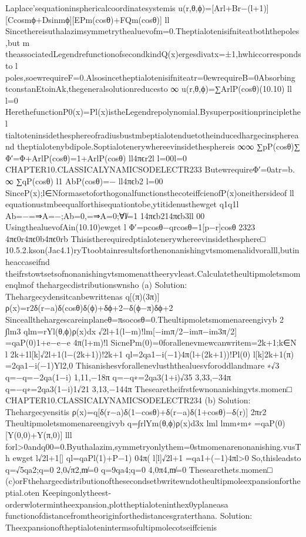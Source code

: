{{{{{{{{{{{{{{{Laplace’sequationinsphericalcoordinatesystemis
u(r,θ,ϕ)=[Arl+Br−(l+1)][Ccosmϕ+Dsinmϕ][EPm(cosθ)+FQm(cosθ)]
ll
Sincethereisuthalazimsymmetrythealuevofm=0.Theptialotenisifniteatboththepoles,but
m
theassociatedLegendrefunctionofsecondkindQ(x)ergesdivatx=±1,hwhiccorrespondsto
l
poles,soewrequireF=0.Alsosincetheptialotenisifniteatr=0ewrequireB=0Absorbing
tconstanEtoinAk,thegeneralsolutionreducesto
∞
u(r,θ,ϕ)=∑ArlP(cosθ)(10.10)
ll
l=0
HerethefunctionP0(x)=Pl(x)istheLegendrepolynomial.Bysuperpositionprinciplethe
l
tialtoteninsidethesphereofradiusbustmbeptialotenduetotheinducedhargecinsphereand
theptialotenybdipole.Soptialotenerywhereevinsidethesphereis
∞∞
∑pP(cosθ)∑
Φ′=Φ+ArlP(cosθ)=1+ArlP(cosθ)
ll4πϵr2l
l=00l=0
CHAPTER10.CLASSICALYNAMICSODELECTR233
ButewrequireΦ′=0atr=b.
∞
∑qP(cosθ)
l1
AbP(cosθ)=−
ll4πϵb2
l=00
Since{P(x);l∈N}formasetoforthogonalfunctionsthecoteiffcienofP(x)oneithersideof
ll
equationustmbeequalforthisequationtobe,ytitidenusthewget
q1q1l
Ab=−=⇒A=−;Ab=0,=⇒A=0;∀l̸=1
14πϵb214πϵb3ll
00
UsingthealuevofAin(10.10)ewget
l
Φ′=pcosθ−qrcosθ=1[p−r]cosθ
2323
4πϵ0r4πϵ0b4πϵ0rb
Thisistherequiredptialotenerywhereevinsidethesphere□
10.5.2.kson(Jac4.1)ryTtoobtainresultsforthenonanishingvtsmomenalidvoralll,butinheaccaseifnd
theifrstowtsetsofnonanishingvtsmomenattheeryvleast.Calculatetheultipmoletsmomenqlmof
thehargecdistributionswnsho
(a)
Solution:
Thehargecydensitcanbewrittenas
q[(π)(3π)]
ρ(x)=r2δ(r−a)δ(cosθ)δ(ϕ)+δϕ+2−δ(ϕ−π)δϕ+2
Sinceallthehargescareinplaneθ=πsocosθ=0.Theultipmoletsmomenareengivyb
2
∫lm3
qlm=rYl(θ,ϕ)ρ(x)dx
√2l+1(l−m)!lm[−imπ/2−imπ−im3π/2]
=qaP(0)1+e−e−e
4π(l+m)!l
SicnePm(0)=0forallenevmewcanwritem=2k+1;k∈N
l
2k+1l[k]√2l+1(l−(2k+1))!2k+1
ql=2qa1−i(−1)4π(l+(2k+1))!Pl(0)
l[k]2k+1(π)
=2qa1−i(−1)Yl2,0
Thisanishesvforallenevlusththealuesvforoddlandmare
∗√3
q=−q=−2qa(1−i)
1,11,−18π
q=−q∗=2qa3(1+i)√35
3,33,−34π
q=−q∗=2qa3(1−i)1√21
3,13,−144π
Thesearetheifrstfewnonanishingvts.momen□
CHAPTER10.CLASSICALYNAMICSODELECTR234
(b)
Solution:
Thehargecyensitis
ρ(x)=q[δ(r−a)δ(1−cosθ)+δ(r−a)δ(1+cosθ)−δ(r)]
2πr2
Theultipmoletsmomenareengivyb
q=∫rlYm(θ,ϕ)ρ(x)d3x
lml
lmm∗m∗
=qaP(0)[Y(0,0)+Y(π,0)]
lll
forl>0andq00=0.Byuthalazim,symmetryonlythem=0stmomenarenonanishing.vusTh
ewget
l√2l+1[]
ql=qaPl(1)+P−1)
04π(
l[l]√2l+1
=qa1+(−1)4πl>0
So,thisleadsto
q=√5qa2;q=0
2,0√π2,m̸=0
q=9qa4;q=0
4,0π4,m̸=0
Thesearethets.momen□
(c)orFthehargecdistributionofthesecondsetbwritewndotheultipmoleexpansionfortheptial.oten
Keepingonlytheest-orderwlotermintheexpansion,plottheptialoteninthex0yplaneasa
functionofdistancefromtheoriginforthedistancesgraterthana.
Solution:
Theexpansionoftheptialotenintermsofultipmolecotseiffcienis
}}}}}}}}}}}}}}}
